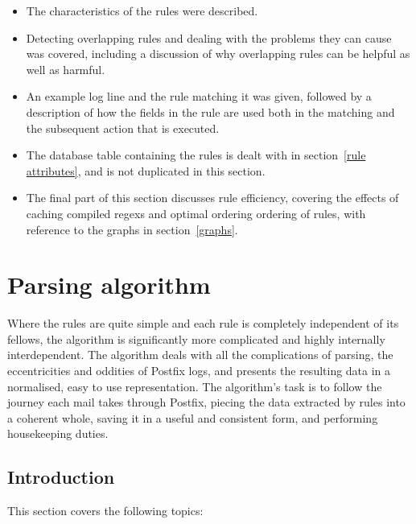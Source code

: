\documentclass[a4paper,12pt,draft]{article}
\begin{document}
\begin{itemize}

    \item The characteristics of the rules were described.

    \item Detecting overlapping rules and dealing with the problems they
        can cause was covered, including a discussion of why overlapping
        rules can be helpful as well as harmful.

    \item An example log line and the rule matching it was given, followed
        by a description of how the fields in the rule are used both in the
        matching and the subsequent action that is executed.

    \item The database table containing the rules is dealt with in
        section~\ref{rule attributes}, and is not duplicated in this
        section.

    \item The final part of this section discusses rule efficiency,
        covering the effects of caching compiled regexs and optimal
        ordering ordering of rules, with reference to the graphs in
        section~\ref{graphs}.

\end{itemize}

\section{Parsing algorithm}

\label{parsing-algorithm}

Where the rules are quite simple and each rule is completely independent of
its fellows, the algorithm is significantly more complicated and highly
internally interdependent.  The algorithm deals with all the complications
of parsing, the eccentricities and oddities of Postfix logs, and presents
the resulting data in a normalised, easy to use representation.  The
algorithm's task is to follow the journey each mail takes through Postfix,
piecing the data extracted by rules into a coherent whole, saving it in a
useful and consistent form, and performing housekeeping duties.

\subsection{Introduction}

This section covers the following topics:
\end{document}
